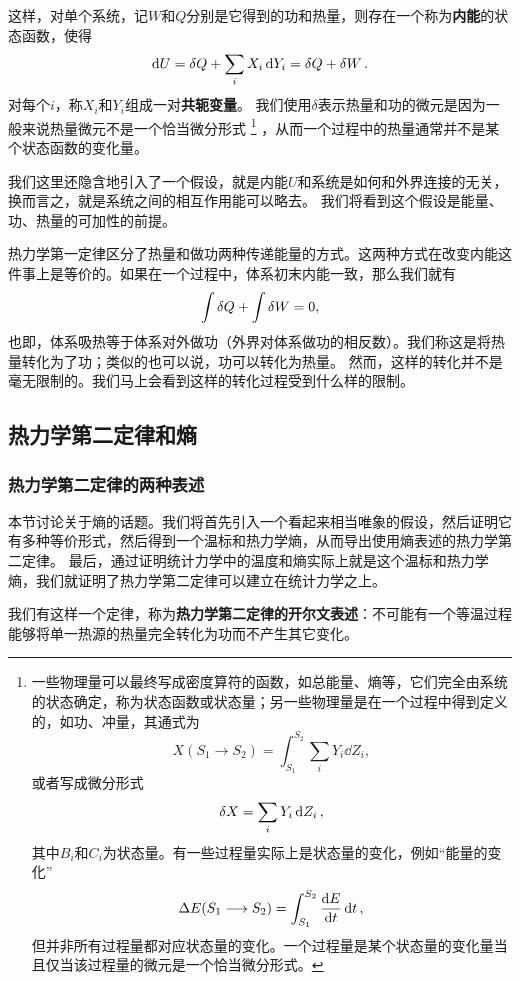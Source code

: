 \documentclass[hyperref, UTF8, a4paper]{ctexart}
\begin{document}
这样，对单个系统，记$W$和$Q$分别是它得到的功和热量，则存在一个称为\textbf{内能}的状态函数，使得
\begin{equation}
    \dd{U} = \delta{Q} + \sum_i X_i \dd{Y_i} = \var{Q} + \var{W}.
    \label{eq:thermodynamics-first-law}
\end{equation}
对每个$i$，称$X_i$和$Y_i$组成一对\textbf{共轭变量}。
我们使用$\delta$表示热量和功的微元是因为一般来说热量微元不是一个恰当微分形式%
\footnote{一些物理量可以最终写成密度算符的函数，如总能量、熵等，它们完全由系统的状态确定，称为状态函数或状态量；另一些物理量是在一个过程中得到定义的，如功、冲量，其通式为
\[
    X(S_1 \longrightarrow S_2) = \int_{S_1}^{S_2} \sum_i Y_i \dd{Z_i},
\]
或者写成微分形式
\[
    \var{X} = \sum_i Y_i \dd{Z_i},
\]
其中$B_i$和$C_i$为状态量。有一些过程量实际上是状态量的变化，例如“能量的变化”
\[
    \Delta E (S_1 \longrightarrow S_2) = \int_{S_1}^{S_2} \dv{E}{t} \dd{t},
\]
但并非所有过程量都对应状态量的变化。一个过程量是某个状态量的变化量当且仅当该过程量的微元是一个恰当微分形式。}%
，从而一个过程中的热量通常并不是某个状态函数的变化量。

我们这里还隐含地引入了一个假设，就是内能$U$和系统是如何和外界连接的无关，换而言之，就是系统之间的相互作用能可以略去。
我们将看到这个假设是能量、功、热量的可加性的前提。

热力学第一定律区分了热量和做功两种传递能量的方式。这两种方式在改变内能这件事上是等价的。如果在一个过程中，体系初末内能一致，那么我们就有
\[
    \int \var{Q} + \int \var{W} = 0,
\]
也即，体系吸热等于体系对外做功（外界对体系做功的相反数）。我们称这是将热量转化为了功；类似的也可以说，功可以转化为热量。
然而，这样的转化并不是毫无限制的。我们马上会看到这样的转化过程受到什么样的限制。

\subsection{热力学第二定律和熵}

\subsubsection{热力学第二定律的两种表述}

本节讨论关于熵的话题。我们将首先引入一个看起来相当唯象的假设，然后证明它有多种等价形式，然后得到一个温标和热力学熵，从而导出使用熵表述的热力学第二定律。
最后，通过证明统计力学中的温度和熵实际上就是这个温标和热力学熵，我们就证明了热力学第二定律可以建立在统计力学之上。

我们有这样一个定律，称为\textbf{热力学第二定律的开尔文表述}：不可能有一个等温过程能够将单一热源的热量完全转化为功而不产生其它变化。
\end{document}
